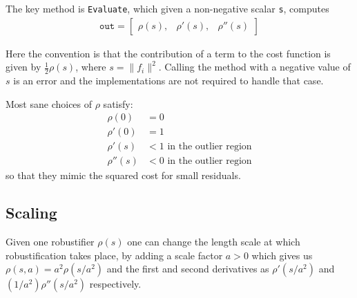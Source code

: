 The key method is \texttt{Evaluate}, which given a non-negative scalar \texttt{s}, computes
\begin{align}
	\texttt{out} = \begin{bmatrix}\rho(s), & \rho'(s), & \rho''(s)\end{bmatrix}
\end{align}

Here the convention is that the contribution of a term to the cost function is given by $\frac{1}{2}\rho(s)$,  where $s = \|f_i\|^2$. Calling the method with a negative value of $s$ is an error and the implementations are not required to handle that case.

Most sane choices of $\rho$ satisfy:
\begin{align}
   \rho(0) &= 0\\
   \rho'(0) &= 1\\
   \rho'(s) &< 1 \text{ in the outlier region}\\
   \rho''(s) &< 0 \text{ in the outlier region}
\end{align}
so that they mimic the squared cost for small residuals.

\subsection{Scaling}
Given one robustifier $\rho(s)$
 one can change the length scale at which robustification takes
 place, by adding a scale factor $a > 0$ which gives us $\rho(s,a) = a^2 \rho(s / a^2)$ and the first and second derivatives as $\rho'(s / a^2)$ and   $(1 / a^2) \rho''(s / a^2)$ respectively.


